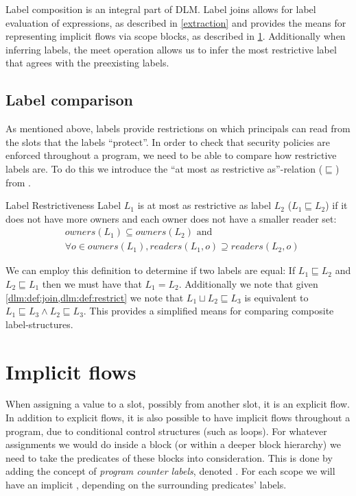 Label composition is an integral part of DLM.
Label joins allows for label evaluation of expressions, as described in \cref{extraction} and provides the means for representing implicit flows via scope blocks, as described in \cref{dlm:implicit_flows}.
Additionally when inferring labels, the meet operation allows us to infer the most restrictive label that agrees with the preexisting labels.

\subsection{Label comparison}\label{dlm:comparison}
As mentioned above, labels provide restrictions on which principals can read from the slots that the labels ``protect''.
In order to check that security policies are enforced throughout a program, we need to be able to compare how restrictive labels are.
To do this we introduce the ``at most as restrictive as''-relation ($\sqsubseteq$) from \cite{myers1997}.

\begin{definition}{Label Restrictiveness}\label{dlm:def:restrict}
  Label $L_1$ is at most as restrictive as label $L_2$ ($L_1 \sqsubseteq L_2$) if it does not have more owners and each owner does not have a smaller reader set:
  \begin{align*}
    & owners(L_1) \subseteq owners(L_2) \text{ and} \\
    & \forall o \in owners(L_1) , readers(L_1, o) \supseteq readers(L_2, o)
  \end{align*}
\end{definition}

We can employ this definition to determine if two labels are equal:
If $L_1 \sqsubseteq L_2$ and $L_2 \sqsubseteq L_1$ then we must have that $L_1 = L_2$.
Additionally we note that given \cref{dlm:def:join,dlm:def:restrict} we note that $L_1 \sqcup L_2 \sqsubseteq L_3$ is equivalent to $L_1 \sqsubseteq L_3 \wedge L_2 \sqsubseteq L_3$.
This provides a simplified means for comparing composite label-structures.

\section{Implicit flows}\label{dlm:implicit_flows}
When assigning a value to a slot, possibly from another slot, it is an explicit flow.
In addition to explicit flows, it is also possible to have implicit flows throughout a program, due to conditional control structures (such as loops).
For whatever assignments we would do inside a block (or within a deeper block hierarchy) we need to take the predicates of these blocks into consideration.
This is done by adding the concept of \emph{program counter labels}, denoted \dlmpc.
For each scope we will have an implicit \dlmpc, depending on the surrounding predicates' labels.


